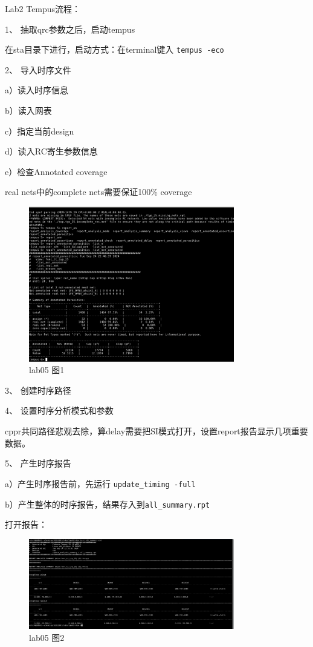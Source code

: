Lab2 Tempus流程：

1、	抽取qrc参数之后，启动tempus

在sta目录下进行，启动方式：在terminal键入 \texttt{tempus -eco}

2、	导入时序文件

a）读入时序信息
 
b）读入网表
 
c）指定当前design
 
d）读入RC寄生参数信息
 
e）检查Annotated coverage
 
real nets中的complete nets需要保证100\% coverage

\begin{figure}[H]
    \centering
    \includegraphics[width=0.8\textwidth]{images/lab05-01.png}
    \caption{lab05 图1}
\end{figure}
 
3、	创建时序路径
 
4、	设置时序分析模式和参数
 
cppr共同路径悲观去除，算delay需要把SI模式打开，设置report报告显示几项重要数据。

5、	产生时序报告

a）产生时序报告前，先运行 \texttt{update\_timing -full}
 
b）产生整体的时序报告，结果存入到\texttt{all\_summary.rpt} 
 
打开报告：

\begin{figure}[H]
    \centering
    \includegraphics[width=0.8\textwidth]{images/lab05-02.png}
    \caption{lab05 图2}
\end{figure}
 
